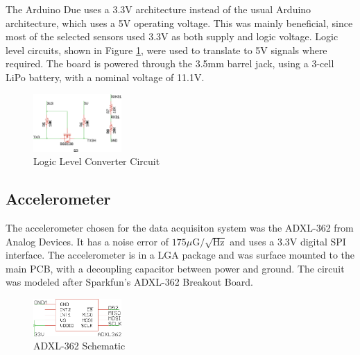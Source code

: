 The Arduino Due uses a 3.3V architecture instead of the usual Arduino architecture, which uses a 5V operating voltage. This was mainly beneficial, since most of the selected sensors used 3.3V as both supply and logic voltage. Logic level circuits, shown in Figure \ref{logicLevel}, were used to translate to 5V signals where required.  The board is powered through the 3.5mm barrel jack, using a 3-cell LiPo battery, with a nominal voltage of 11.1V.
\begin{figure}[H]

  \centering
    \includegraphics[width=0.3\textwidth]{figures/logicLevelConverterSchematic.eps}
      \caption{Logic Level Converter Circuit} \label{logicLevel}
\end{figure}

\subsection*{Accelerometer}
The accelerometer chosen for the data acquisiton system was the ADXL-362 from Analog Devices. It has a noise error of $175\mu\text{G}/\sqrt{\text{Hz}}$ and uses a 3.3V digital SPI interface\cite{adxl362DataSheet}. The accelerometer is in a LGA package and was surface mounted to the main PCB, with a decoupling capacitor between power and ground. The circuit was modeled after Sparkfun's ADXL-362 Breakout Board\cite{Sparkfunadxl362BOB}.
\begin{figure}[H]

  \centering
    \includegraphics[width=0.3\textwidth]{figures/adxl362.eps}
      \caption{ADXL-362 Schematic} \label{adxl362Schematic}
\end{figure}

